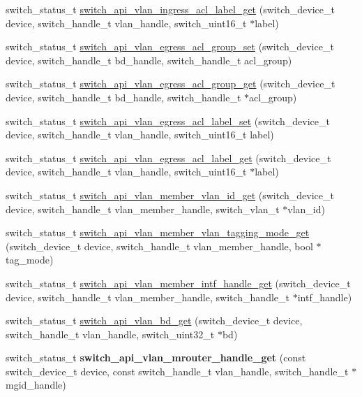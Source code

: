 \begin{DoxyCompactItemize}
\item 
switch\+\_\+status\+\_\+t \hyperlink{group__VLAN_gaa88eb71f9ccb153e745e729ba5dba231}{switch\+\_\+api\+\_\+vlan\+\_\+ingress\+\_\+acl\+\_\+label\+\_\+get} (switch\+\_\+device\+\_\+t device, switch\+\_\+handle\+\_\+t vlan\+\_\+handle, switch\+\_\+uint16\+\_\+t $\ast$label)
\item 
switch\+\_\+status\+\_\+t \hyperlink{group__VLAN_ga14a187a4d10477fa336aa56b7590f2ad}{switch\+\_\+api\+\_\+vlan\+\_\+egress\+\_\+acl\+\_\+group\+\_\+set} (switch\+\_\+device\+\_\+t device, switch\+\_\+handle\+\_\+t bd\+\_\+handle, switch\+\_\+handle\+\_\+t acl\+\_\+group)
\item 
switch\+\_\+status\+\_\+t \hyperlink{group__VLAN_gabb9d7e044d367704553e0f16d489ac10}{switch\+\_\+api\+\_\+vlan\+\_\+egress\+\_\+acl\+\_\+group\+\_\+get} (switch\+\_\+device\+\_\+t device, switch\+\_\+handle\+\_\+t bd\+\_\+handle, switch\+\_\+handle\+\_\+t $\ast$acl\+\_\+group)
\item 
switch\+\_\+status\+\_\+t \hyperlink{group__VLAN_ga39907b2fbbe0af7d53c647b02ee5489f}{switch\+\_\+api\+\_\+vlan\+\_\+egress\+\_\+acl\+\_\+label\+\_\+set} (switch\+\_\+device\+\_\+t device, switch\+\_\+handle\+\_\+t vlan\+\_\+handle, switch\+\_\+uint16\+\_\+t label)
\item 
switch\+\_\+status\+\_\+t \hyperlink{group__VLAN_ga847d469b74bb8af097e041d949a3a280}{switch\+\_\+api\+\_\+vlan\+\_\+egress\+\_\+acl\+\_\+label\+\_\+get} (switch\+\_\+device\+\_\+t device, switch\+\_\+handle\+\_\+t vlan\+\_\+handle, switch\+\_\+uint16\+\_\+t $\ast$label)
\item 
switch\+\_\+status\+\_\+t \hyperlink{group__VLAN_ga54044f38b7a574c8ab0ae21621a87b8c}{switch\+\_\+api\+\_\+vlan\+\_\+member\+\_\+vlan\+\_\+id\+\_\+get} (switch\+\_\+device\+\_\+t device, switch\+\_\+handle\+\_\+t vlan\+\_\+member\+\_\+handle, switch\+\_\+vlan\+\_\+t $\ast$vlan\+\_\+id)
\item 
switch\+\_\+status\+\_\+t \hyperlink{group__VLAN_gab1e499e8b360f92912e0cbb4f8c6feae}{switch\+\_\+api\+\_\+vlan\+\_\+member\+\_\+vlan\+\_\+tagging\+\_\+mode\+\_\+get} (switch\+\_\+device\+\_\+t device, switch\+\_\+handle\+\_\+t vlan\+\_\+member\+\_\+handle, bool $\ast$tag\+\_\+mode)
\item 
switch\+\_\+status\+\_\+t \hyperlink{group__VLAN_ga68553f8c739a578f248f2cf90772fe6b}{switch\+\_\+api\+\_\+vlan\+\_\+member\+\_\+intf\+\_\+handle\+\_\+get} (switch\+\_\+device\+\_\+t device, switch\+\_\+handle\+\_\+t vlan\+\_\+member\+\_\+handle, switch\+\_\+handle\+\_\+t $\ast$intf\+\_\+handle)
\item 
switch\+\_\+status\+\_\+t \hyperlink{group__VLAN_ga91f53bad27e089d735a6f0d43f902757}{switch\+\_\+api\+\_\+vlan\+\_\+bd\+\_\+get} (switch\+\_\+device\+\_\+t device, switch\+\_\+handle\+\_\+t vlan\+\_\+handle, switch\+\_\+uint32\+\_\+t $\ast$bd)
\item 
\hypertarget{group__VLAN_ga3443a531c8332eea4e79af6ffeffe645}{switch\+\_\+status\+\_\+t {\bfseries switch\+\_\+api\+\_\+vlan\+\_\+mrouter\+\_\+handle\+\_\+get} (const switch\+\_\+device\+\_\+t device, const switch\+\_\+handle\+\_\+t vlan\+\_\+handle, switch\+\_\+handle\+\_\+t $\ast$mgid\+\_\+handle)}\label{group__VLAN_ga3443a531c8332eea4e79af6ffeffe645}


\end{DoxyCompactItemize}
